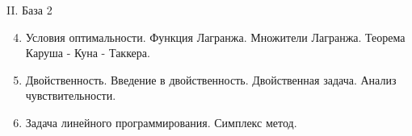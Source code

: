 \documentclass[9pt, aspectratio=169]{beamer}
\begin{document}
\begin{frame}{II. База 2}
    \begin{minipage}{0.618\textwidth}
        \begin{enumerate}
            \setcounter{enumi}{3}
            \item Условия оптимальности. Функция Лагранжа. Множители Лагранжа. Теорема Каруша - Куна - Таккера.
            \item Двойственность. Введение в двойственность. Двойственная задача. Анализ чувствительности.
            \item Задача линейного программирования. Симплекс метод.
        \end{enumerate}
      \end{minipage}%
      \begin{minipage}{0.382\textwidth}
      \end{minipage}
\end{frame}
\end{document}
